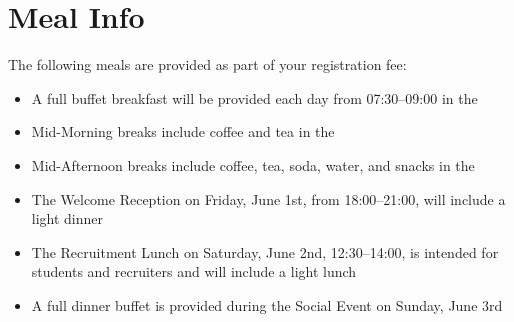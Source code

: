 \setheaders{}{}
\section{Meal Info}{}

The following meals are provided as part of your registration fee:

\begin{itemize}
\item A full buffet breakfast will be provided each day from 07:30--09:00 in the \BreakLoc
\item Mid-Morning breaks include coffee and tea in the \BreakLoc
\item Mid-Afternoon breaks include coffee, tea, soda, water, and snacks in the \BreakLoc
\item The Welcome Reception on Friday, June 1st, from 18:00--21:00, will include a light dinner
\item The Recruitment Lunch on Saturday, June 2nd, 12:30--14:00, is intended for students and recruiters and will include a light lunch
\item A full dinner buffet is provided during the Social Event on Sunday, June 3rd 
\end{itemize}
